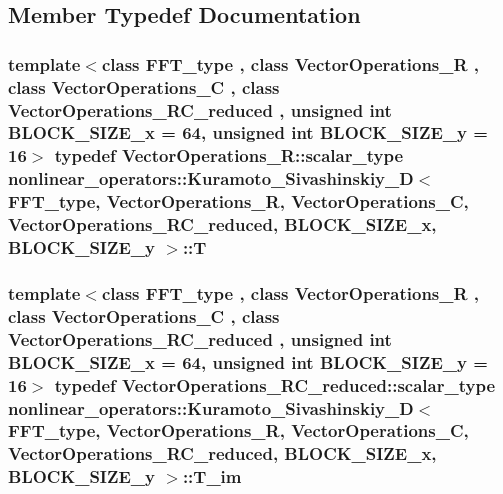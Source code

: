 \subsection{Member Typedef Documentation}
\hypertarget{classnonlinear__operators_1_1Kuramoto__Sivashinskiy__2D_a108220178ea58555cba481a0c8960404}{
\subsubsection[{T}]{\setlength{\rightskip}{0pt plus 5cm}template$<$class F\-F\-T\-\_\-type , class Vector\-Operations\-\_\-\-R , class Vector\-Operations\-\_\-\-C , class Vector\-Operations\-\_\-\-R\-C\-\_\-reduced , unsigned int B\-L\-O\-C\-K\-\_\-\-S\-I\-Z\-E\-\_\-x = 64, unsigned int B\-L\-O\-C\-K\-\_\-\-S\-I\-Z\-E\-\_\-y = 16$>$ typedef Vector\-Operations\-\_\-\-R\-::scalar\-\_\-type {\bf nonlinear\-\_\-operators\-::\-Kuramoto\-\_\-\-Sivashinskiy\-\_\-D}$<$ F\-F\-T\-\_\-type, Vector\-Operations\-\_\-\-R, Vector\-Operations\-\_\-\-C, Vector\-Operations\-\_\-\-R\-C\-\_\-reduced, B\-L\-O\-C\-K\-\_\-\-S\-I\-Z\-E\-\_\-x, B\-L\-O\-C\-K\-\_\-\-S\-I\-Z\-E\-\_\-y $>$\-::{\bf T}}}\label{classnonlinear__operators_1_1Kuramoto__Sivashinskiy__2D_a108220178ea58555cba481a0c8960404}
\hypertarget{classnonlinear__operators_1_1Kuramoto__Sivashinskiy__2D_afa96a5432720d8e643e6bec9bc89cd1a}{
\subsubsection[{T\-\_\-im}]{\setlength{\rightskip}{0pt plus 5cm}template$<$class F\-F\-T\-\_\-type , class Vector\-Operations\-\_\-\-R , class Vector\-Operations\-\_\-\-C , class Vector\-Operations\-\_\-\-R\-C\-\_\-reduced , unsigned int B\-L\-O\-C\-K\-\_\-\-S\-I\-Z\-E\-\_\-x = 64, unsigned int B\-L\-O\-C\-K\-\_\-\-S\-I\-Z\-E\-\_\-y = 16$>$ typedef Vector\-Operations\-\_\-\-R\-C\-\_\-reduced\-::scalar\-\_\-type {\bf nonlinear\-\_\-operators\-::\-Kuramoto\-\_\-\-Sivashinskiy\-\_\-D}$<$ F\-F\-T\-\_\-type, Vector\-Operations\-\_\-\-R, Vector\-Operations\-\_\-\-C, Vector\-Operations\-\_\-\-R\-C\-\_\-reduced, B\-L\-O\-C\-K\-\_\-\-S\-I\-Z\-E\-\_\-x, B\-L\-O\-C\-K\-\_\-\-S\-I\-Z\-E\-\_\-y $>$\-::{\bf T\-\_\-im}}}\label{classnonlinear__operators_1_1Kuramoto__Sivashinskiy__2D_afa96a5432720d8e643e6bec9bc89cd1a}
